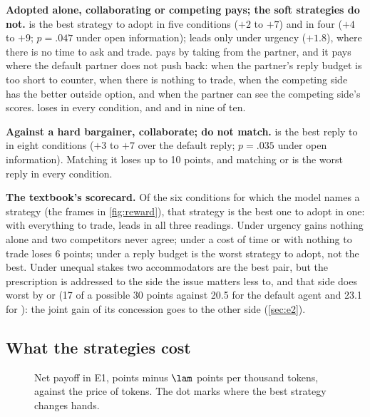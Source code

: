 \textbf{Adopted alone, collaborating or competing pays; the soft strategies do not.} \collaborating{} is the best strategy to adopt in five conditions ($+2$ to $+7$) and \competing{} in four ($+4$ to $+9$; $p = .047$ under open information); \accommodating{} leads only under urgency ($+1.8$), where there is no time to ask and trade. \competing{} pays by taking from the partner, and it pays where the default partner does not push back: when the partner's reply budget is too short to counter, when there is nothing to trade, when the competing side has the better outside option, and when the partner can see the competing side's scores. \avoiding{} loses in every condition, and \compromising{} and \accommodating{} in nine of ten.

\textbf{Against a hard bargainer, collaborate; do not match.} \collaborating{} is the best reply to \competing{} in eight conditions ($+3$ to $+7$ over the default reply; $p = .035$ under open information). Matching it loses up to 10 points, and matching or \avoiding{} is the worst reply in every condition.

\textbf{The textbook's scorecard.} Of the six conditions for which the model names a strategy (the frames in \cref{fig:reward}), that strategy is the best one to adopt in one: with everything to trade, \collaborating{} leads in all three readings. Under urgency \competing{} gains nothing alone and two competitors never agree; under a cost of time or with nothing to trade \compromising{} loses 6 points; under a reply budget \avoiding{} is the worst strategy to adopt, not the best. Under unequal stakes two accommodators are the best pair, but the prescription is addressed to the side the issue matters less to, and that side does worst by \accommodating{} or \avoiding{} (17 of a possible 30 points against 20.5 for the default agent and 23.1 for \competing): the joint gain of its concession goes to the other side (\cref{sec:e2}).

\subsection{What the strategies cost}
\label{sec:r-cost}

\begin{figure}[t]
\centering
\FigCost
\caption{Net payoff in E1, points minus $\lam$ points per thousand tokens, against the price of tokens. The dot marks where the best strategy changes hands.}
\label{fig:cost}
\end{figure}

